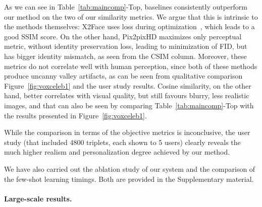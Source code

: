 \documentclass[10pt,twocolumn,letterpaper]{article}
\newcommand{\fig}[1]{Figure~\ref{fig:#1}}
\newcommand{\tab}[1]{Table~\ref{tab:#1}}
\begin{document}
As we can see in \tab{maincomp}-Top, baselines consistently outperform our method on the two of our similarity metrics. We argue that this is intrinsic to the methods themselves: X2Face uses  loss during optimization~\cite{Wiles18}, which leads to a good SSIM score. On the other hand, Pix2pixHD maximizes only perceptual metric, without identity preservation loss, leading to minimization of FID, but has bigger identity mismatch, as seen from the CSIM column. Moreover, these metrics do not correlate well with human perception, since both of these methods produce uncanny valley artifacts, as can be seen from qualitative comparison \fig{voxceleb1} and the user study results. Cosine similarity, on the other hand, better correlates with visual quality, but still favours blurry, less realistic images, and that can also be seen by comparing \tab{maincomp}-Top with the results presented in \fig{voxceleb1}.

While the comparison in terms of the objective metrics is inconclusive, the user study (that included 4800 triplets, each shown to 5 users) clearly reveals the much higher realism and personalization degree achieved by our method.

We have also carried out the ablation study of our system and the comparison of the few-shot learning timings. Both are provided in the Supplementary material.

\paragraph{Large-scale results.}
\end{document}
